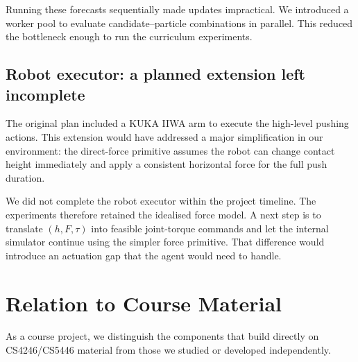 \documentclass[12pt]{article}
\begin{document}
Running these forecasts sequentially made updates impractical. We introduced a worker pool to evaluate candidate--particle combinations in parallel. This reduced the bottleneck enough to run the curriculum experiments.

\subsection{Robot executor: a planned extension left incomplete}
The original plan included a KUKA IIWA arm to execute the high-level pushing actions. This extension would have addressed a major simplification in our environment: the direct-force primitive assumes the robot can change contact height immediately and apply a consistent horizontal force for the full push duration.

We did not complete the robot executor within the project timeline. The experiments therefore retained the idealised force model. A next step is to translate \((h,F,\tau)\) into feasible joint-torque commands and let the internal simulator continue using the simpler force primitive. That difference would introduce an actuation gap that the agent would need to handle.

\section{Relation to Course Material}\label{app:course}
As a course project, we distinguish the components that build directly on CS4246/CS5446 material from those we studied or developed independently.
\end{document}
